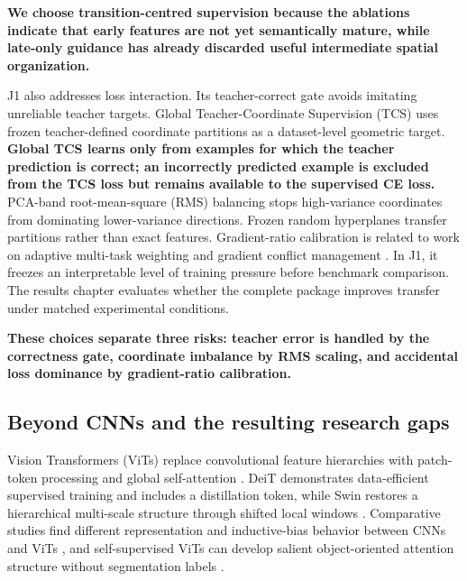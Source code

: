 \textbf{We choose transition-centred supervision because the ablations indicate
that early features are not yet semantically mature, while late-only guidance
has already discarded useful intermediate spatial organization.}

J1 also addresses loss interaction. Its teacher-correct gate avoids imitating
unreliable teacher targets. Global Teacher-Coordinate Supervision (TCS)
\cite{chan2026j1} uses frozen teacher-defined coordinate partitions as a
dataset-level geometric target. \textbf{Global TCS learns only from examples
for which the teacher prediction is correct; an incorrectly predicted example
is excluded from the TCS loss but remains available to the supervised CE loss.}
PCA-band
root-mean-square (RMS) balancing stops high-variance
coordinates from dominating lower-variance directions. Frozen random
hyperplanes transfer partitions rather than exact features. Gradient-ratio
calibration is related to work on adaptive multi-task weighting and gradient
conflict management \cite{chen2018gradnorm,kendall2018multitask,
sener2018multiobjective,yu2020pcgrad}. In J1, it freezes an interpretable level
of training pressure before benchmark comparison. The results chapter
evaluates whether the complete package improves transfer under matched
experimental conditions.

\textbf{These choices separate three risks: teacher error is handled by the
correctness gate, coordinate imbalance by RMS scaling, and accidental loss
dominance by gradient-ratio calibration.}

\subsection{Beyond CNNs and the resulting research gaps}

Vision Transformers (ViTs) replace convolutional feature hierarchies with
patch-token processing and global self-attention
\cite{dosovitskiy2021vit}. DeiT demonstrates data-efficient supervised
training and includes a distillation token, while Swin restores a hierarchical
multi-scale structure through shifted local windows
\cite{touvron2021deit,liu2021swin}. Comparative studies find different
representation and inductive-bias behavior between CNNs and ViTs
\cite{raghu2021vitcnn}, and self-supervised ViTs can develop salient
object-oriented attention structure without segmentation labels
\cite{caron2021dino}.

